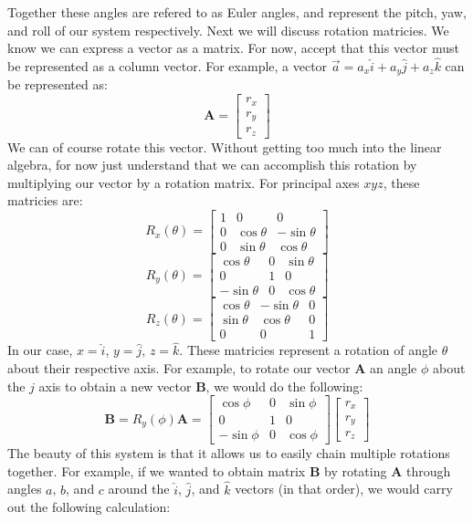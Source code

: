 \documentclass[12pt, letterpaper]{article}
\begin{document}
Together these angles are refered to as Euler angles, and represent the pitch, yaw, and roll of our system respectively.
Next we will discuss rotation matricies. We know we can express a vector as a matrix. For now, accept that this vector must be represented as a column vector. For example, a vector $\vec{a} = a_x\hat{i} + a_y\hat{j} + a_z\hat{k}$ can be represented as:
\[ \textbf{A} = 
\begin{bmatrix}
r_x \\ r_y \\ r_z
\end{bmatrix}
\]
We can of course rotate this vector. Without getting too much into the linear algebra, for now just understand that we can accomplish this rotation by multiplying our vector by a rotation matrix. For principal axes $xyz$, these matricies are:
\[ R_x(\theta) = 
\begin{bmatrix}
1 & 0 & 0 \\
0 & \cos \theta & -\sin \theta \\
0 & \sin \theta & \cos \theta
\end{bmatrix}
\] \[ R_y(\theta) =
\begin{bmatrix}
\cos \theta & 0 & \sin \theta \\
0 & 1 & 0 \\
-\sin \theta & 0 & \cos \theta
\end{bmatrix}
\] \[ R_z(\theta) = 
\begin{bmatrix}
\cos \theta & -\sin \theta & 0 \\
\sin \theta & \cos \theta & 0 \\
0 & 0 & 1
\end{bmatrix}
\]
In our case, $x=\hat{i}$, $y=\hat{j}$, $z=\hat{k}$. These matricies represent a rotation of angle $\theta$ about their respective axis. For example, to rotate our vector $\textbf{A}$ an angle $\phi$ about the $\hat{j}$ axis to obtain a new vector $\textbf{B}$, we would do the following:
\[
\textbf{B} = R_y(\phi)\textbf{A} = 
\begin{bmatrix}
\cos \phi & 0 & \sin \phi \\
0 & 1 & 0 \\
-\sin \phi & 0 & \cos \phi
\end{bmatrix} \begin{bmatrix}
r_x \\ r_y \\ r_z
\end{bmatrix}
\]
The beauty of this system is that it allows us to easily chain multiple rotations together. For example, if we wanted to obtain matrix $\textbf{B}$ by rotating $\textbf{A}$ through angles $a$, $b$, and $c$ around the $\hat{i}$, $\hat{j}$, and $\hat{k}$ vectors (in that order), we would carry out the following calculation:
\end{document}
